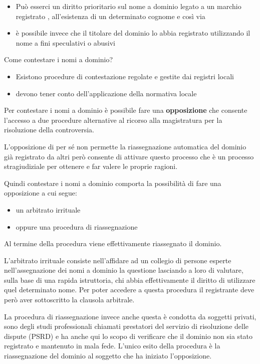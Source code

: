 \begin{itemize}
    \item Può esserci un diritto prioritario sul nome a dominio legato a un marchio registrato , all'esistenza di un determinato cognome e così via
    \item è possibile invece che il titolare del dominio lo abbia registrato utilizzando il nome a fini speculativi o abusivi
\end{itemize}

Come contestare i nomi a dominio?
\begin{itemize}
    \item Esistono procedure di contestazione regolate e gestite dai registri locali
    \item devono tener conto dell'applicazione della normativa locale
\end{itemize}

Per contestare i nomi a dominio è possibile fare una \textbf{opposizione} che consente l'accesso a due procedure alternative al ricorso alla magistratura per la risoluzione della controversia. 

L'opposizione di per sé non permette la riassegnazione automatica del dominio già registrato da altri però consente di attivare questo processo che è un processo stragiudiziale per ottenere e far valere le proprie ragioni.

Quindi contestare i nomi a dominio comporta la possibilità di fare una opposizione a cui segue:

\begin{itemize}
    \item un arbitrato irrituale
    \item oppure una procedura di riassegnazione
\end{itemize}

Al termine della procedura viene effettivamente riassegnato il dominio. 

L'arbitrato irrituale consiste nell'affidare ad un collegio di persone esperte nell'assegnazione dei nomi a dominio la questione lasciando a loro di valutare, sulla base di una rapida istruttoria, chi abbia effettivamente il diritto di utilizzare quel determinato nome. Per poter accedere a questa procedura il registrante deve però aver sottoscritto la clausola arbitrale.

La procedura di riassegnazione invece anche questa è condotta da soggetti privati, sono degli studi professionali chiamati prestatori del servizio di risoluzione delle dispute (PSRD) e ha anche qui lo scopo di verificare che il dominio non sia stato registrato e mantenuto in mala fede. L'unico esito della procedura è la riassegnazione del dominio al soggetto che ha iniziato l'opposizione.

